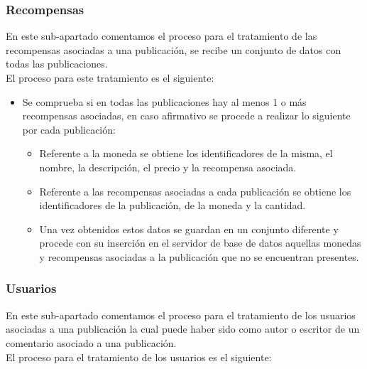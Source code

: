 \documentclass[../../main.tex]{subfiles}
\begin{document}
\subsubsection{Recompensas}

En este sub-apartado comentamos el proceso para el tratamiento de las recompensas asociadas a una publicación, se recibe un conjunto de datos con todas las publicaciones.  \\

El proceso para este tratamiento es el siguiente:

\begin{itemize}
    \item Se comprueba si en todas las publicaciones hay al menos 1 o más recompensas asociadas, en caso afirmativo se procede a realizar lo siguiente por cada publicación:
    \begin{itemize}
        \item Referente a la moneda se obtiene los identificadores de la misma, el nombre, la descripción, el precio y la recompensa asociada.
        \item Referente a las recompensas asociadas a cada publicación se obtiene los identificadores de la publicación, de la moneda y la cantidad.
        \item Una vez obtenidos estos datos se guardan en un conjunto diferente y procede con su inserción en el servidor de base de datos aquellas monedas y recompensas asociadas a la publicación que no se encuentran presentes.
    \end{itemize}
\end{itemize}


\subsubsection{Usuarios}

En este sub-apartado comentamos el proceso para el tratamiento de los usuarios asociadas a una publicación la cual puede haber sido como autor o escritor de un comentario asociado a una publicación.  \\

El proceso para el tratamiento de los usuarios es el siguiente:
\end{document}
